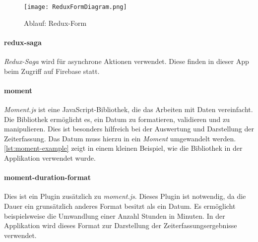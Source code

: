 \begin{figure}[h]
    \centering
    \texttt{[image: ReduxFormDiagram.png]}
    \caption{Ablauf: Redux-Form}
    \label{fig:ReduxForm}
\end{figure}

\paragraph{redux-saga}
\textit{Redux-Saga} wird für asynchrone Aktionen verwendet. Diese finden in dieser
App beim Zugriff auf Firebase statt. \cite{ReduxSaga:online,}

\paragraph{moment}
\textit{Moment.js} ist eine JavaScript-Bibliothek, die das Arbeiten mit Daten vereinfacht. Die Bibliothek ermöglicht es,
ein Datum zu formatieren, validieren und zu manipulieren. Dies ist besonders hilfreich bei der Auswertung und Darstellung der
Zeiterfassung. Das Datum muss hierzu in ein \textit{Moment} umgewandelt werden. \autoref{lst:moment-example} zeigt in einem kleinen Beispiel,
wie die Bibliothek in der Applikation verwendet wurde.\cite{MomentJS:online}


\paragraph{moment-duration-format}
Dies ist ein Plugin zusätzlich zu \textit{moment.js}. Dieses Plugin ist notwendig, da die Dauer ein
grunsätzlich anderes Format besitzt als ein Datum. Es ermöglicht beispielsweise die Umwandlung einer Anzahl Stunden in Minuten.
In der Applikation wird dieses Format zur Darstellung der Zeiterfassungsergebnisse verwendet. \cite{MomentDuration:online}